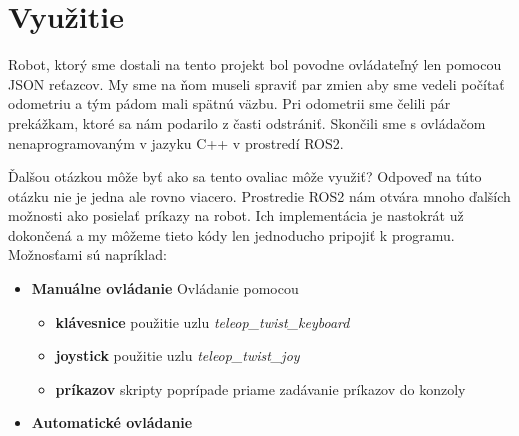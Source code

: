 
\section{Využitie}
\label{sec:vyuzitie}

Robot, ktorý sme dostali na tento projekt bol povodne ovládateľný len pomocou JSON reťazcov. My sme na ňom museli spraviť
par zmien aby sme vedeli počítať odometriu a tým pádom mali spätnú väzbu. Pri odometrii sme čelili pár prekážkam, ktoré
sa nám podarilo z časti odstrániť. Skončili sme s ovládačom nenaprogramovaným v jazyku C++ v prostredí ROS2.

Ďalšou otázkou môže byť ako sa tento ovaliac môže využiť? Odpoveď na túto otázku nie je jedna ale rovno viacero.
Prostredie ROS2 nám otvára mnoho ďalších možnosti ako posielať príkazy na robot. Ich implementácia je nastokrát už
dokončená a my môžeme tieto kódy len jednoducho pripojiť k programu. Možnosťami sú napríklad:

\begin{itemize}
	\item \textbf{Manuálne ovládanie} Ovládanie pomocou
		\begin{itemize}
			\item \textbf{klávesnice} použitie uzlu \textit{teleop\_twist\_keyboard}
			\item \textbf{joystick} použitie uzlu \textit{teleop\_twist\_joy}
			\item \textbf{príkazov} skripty poprípade priame zadávanie príkazov do konzoly
		\end{itemize}
	\item \textbf{Automatické ovládanie}
\end{itemize}

